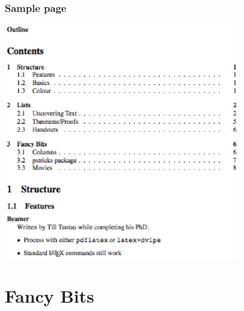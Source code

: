 \documentclass{beamer}
\begin{document}
\begin{frame}
 \frametitle{Sample page}
        \includegraphics[width=4.1in]{beamer-article-sample}

 \end{frame}




\section{Fancy Bits}
\end{document}
